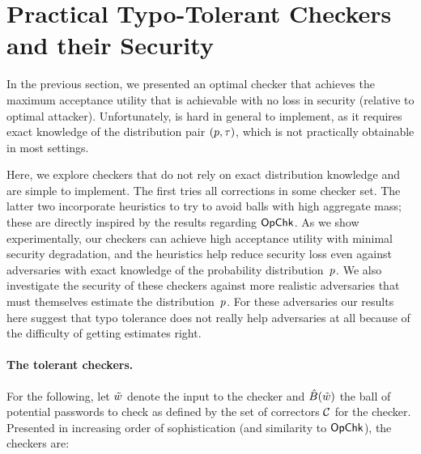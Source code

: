 \section{Practical Typo-Tolerant Checkers \\and their Security}
\label{sec:security}


In the previous section, we presented an optimal checker \opchecker
that achieves the maximum acceptance utility that is achievable with
no loss in security (relative to optimal attacker). Unfortunately,
\opchecker is hard in general to implement, as it requires exact
knowledge of the distribution pair $(p, \tau)$, which is
not practically obtainable in most settings.

Here, we explore checkers that do not rely on exact distribution knowledge and
are simple to implement. The first tries all corrections in some
checker set. The latter two incorporate heuristics to try to avoid balls with
high aggregate mass; these are directly inspired by the results regarding
$\textnormal{\textsf{OpChk}}$.  As we show experimentally, our checkers can achieve high
acceptance utility with minimal security degradation, and the heuristics help
reduce security loss even 
against adversaries with exact knowledge of the probability distribution~$p$.  We also investigate the security of these checkers
against more realistic adversaries that must themselves estimate the 
distribution~$p$. For these adversaries our 
results here suggest that typo tolerance does
not really help adversaries at all because of the difficulty of getting
estimates right.

\paragraph{The tolerant checkers.} 
For the following, let $\tilde{w}$ denote the input to the checker and
$\hat{B}(\tilde{w})$ the ball of potential passwords to check as defined by the
set of correctors ${\mathcal C}$ for the checker. Presented in increasing order of
sophistication (and similarity to $\textnormal{\textsf{OpChk}}$), the checkers are:

